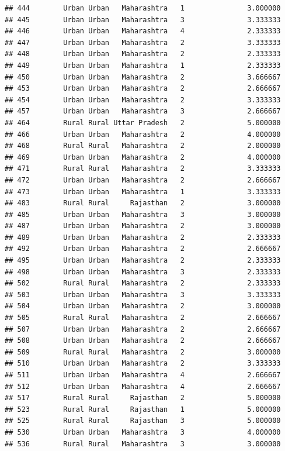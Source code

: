 \documentclass[
]{article}
\begin{document}
\begin{verbatim}
## 444        Urban Urban   Maharashtra   1               3.000000
## 445        Urban Urban   Maharashtra   3               3.333333
## 446        Urban Urban   Maharashtra   4               2.333333
## 447        Urban Urban   Maharashtra   2               3.333333
## 448        Urban Urban   Maharashtra   2               2.333333
## 449        Urban Urban   Maharashtra   1               2.333333
## 450        Urban Urban   Maharashtra   2               3.666667
## 453        Urban Urban   Maharashtra   2               2.666667
## 454        Urban Urban   Maharashtra   2               3.333333
## 457        Urban Urban   Maharashtra   3               2.666667
## 464        Rural Rural Uttar Pradesh   2               5.000000
## 466        Urban Urban   Maharashtra   2               4.000000
## 468        Rural Rural   Maharashtra   2               2.000000
## 469        Urban Urban   Maharashtra   2               4.000000
## 471        Rural Rural   Maharashtra   2               3.333333
## 472        Urban Urban   Maharashtra   2               2.666667
## 473        Urban Urban   Maharashtra   1               3.333333
## 483        Rural Rural     Rajasthan   2               3.000000
## 485        Urban Urban   Maharashtra   3               3.000000
## 487        Urban Urban   Maharashtra   2               3.000000
## 489        Urban Urban   Maharashtra   2               2.333333
## 492        Urban Urban   Maharashtra   2               2.666667
## 495        Urban Urban   Maharashtra   2               2.333333
## 498        Urban Urban   Maharashtra   3               2.333333
## 502        Rural Rural   Maharashtra   2               2.333333
## 503        Urban Urban   Maharashtra   3               3.333333
## 504        Urban Urban   Maharashtra   2               3.000000
## 505        Rural Rural   Maharashtra   2               2.666667
## 507        Urban Urban   Maharashtra   2               2.666667
## 508        Urban Urban   Maharashtra   2               2.666667
## 509        Rural Rural   Maharashtra   2               3.000000
## 510        Urban Urban   Maharashtra   2               3.333333
## 511        Urban Urban   Maharashtra   4               2.666667
## 512        Urban Urban   Maharashtra   4               2.666667
## 517        Rural Rural     Rajasthan   2               5.000000
## 523        Rural Rural     Rajasthan   1               5.000000
## 525        Rural Rural     Rajasthan   3               5.000000
## 530        Urban Urban   Maharashtra   3               4.000000
## 536        Rural Rural   Maharashtra   3               3.000000

\end{verbatim}
\end{document}
